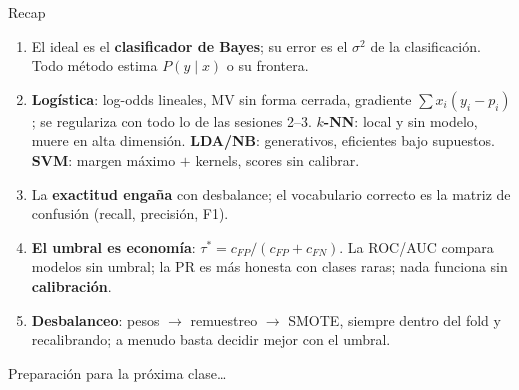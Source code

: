 \documentclass{beamer}
\newcommand{\1}{\mathbb{I}}
\begin{document}
\begin{frame}{Recap}
\small
\begin{enumerate}\itemsep6pt
  \item El ideal es el \textbf{clasificador de Bayes}; su error es el $\sigma^2$ de la clasificación. Todo método estima $P(y \mid x)$ o su frontera.
  \item \textbf{Logística}: log-odds lineales, MV sin forma cerrada, gradiente $\sum x_i(y_i - p_i)$; se regulariza con todo lo de las sesiones 2--3. \textbf{$k$-NN}: local y sin modelo, muere en alta dimensión. \textbf{LDA/NB}: generativos, eficientes bajo supuestos. \textbf{SVM}: margen máximo $+$ kernels, scores sin calibrar.
  \item La \textbf{exactitud engaña} con desbalance; el vocabulario correcto es la matriz de confusión (recall, precisión, F1).
  \item \textbf{El umbral es economía}: $\tau^* = c_{FP}/(c_{FP} + c_{FN})$. La ROC/AUC compara modelos sin umbral; la PR es más honesta con clases raras; nada funciona sin \textbf{calibración}.
  \item \textbf{Desbalanceo}: pesos $\rightarrow$ remuestreo $\rightarrow$ SMOTE, siempre dentro del fold y recalibrando; a menudo basta decidir mejor con el umbral.
\end{enumerate}
\end{frame}

\begin{frame}
\vspace{2.0cm}
\Large{Preparación para la próxima clase\ldots}
\end{frame}

\end{document}
